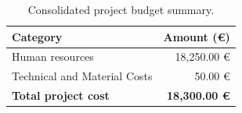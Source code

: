 \begin{table}[H]
	\centering
	\small
	\begin{tabular}{l r}
		\toprule
		\textbf{Category} & \textbf{Amount (€)} \\
		\midrule
		Human resources & 18,250.00 € \\
		Technical and Material Costs & 50.00 € \\
		\midrule
		\textbf{Total project cost} & \textbf{18,300.00 €} \\
		\bottomrule
	\end{tabular}
	\caption{Consolidated project budget summary.}
	\label{tab:budget_summary}
\end{table}